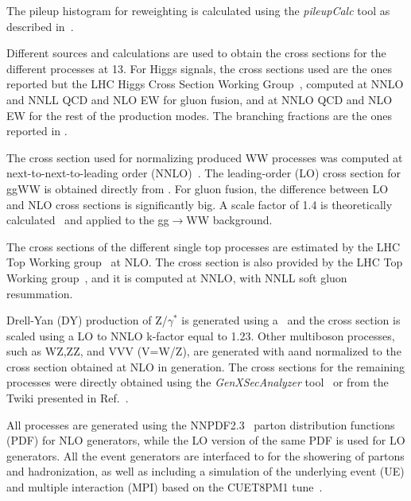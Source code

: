 The pileup histogram for reweighting is calculated using the \emph{pileupCalc} tool as described in~\cite{puJSON}. 


Different sources and calculations are used to obtain the cross sections for the different processes at 13\TeV. 
For Higgs signals, the cross sections used are the ones reported but the LHC Higgs Cross Section Working Group~\cite{temphiggsxsecs},
computed at NNLO and NNLL QCD and NLO EW for gluon fusion, and at NNLO QCD and NLO EW for the rest of the production modes.
The branching fractions are the ones reported in \cite{Heinemeyer:2013tqa}. 

The cross section used for normalizing \qqbar produced WW processes was computed at next-to-next-to-leading order
(NNLO)~\cite{Gehrmann:2014fva}. The leading-order (LO) cross section for ggWW is obtained directly from \MCFM.
For gluon fusion, the difference between LO and NLO cross sections is significantly big.
A scale factor of 1.4 is theoretically calculated~\cite{Caola:2015rqy} and applied to the gg$\to$WW background. 


The cross sections of the different single top processes are estimated by the LHC Top Working group~\cite{singletop} at NLO.
The \ttbar cross section is also provided by the LHC Top Working group~\cite{topxsec}, and it is computed at NNLO, with NNLL soft gluon resummation. 

Drell-Yan (DY) production of Z/$\gamma^{*}$ is generated using a\MADGRAPH~\cite{Alwall:2014hca} and the cross section is scaled using a LO to NNLO k-factor equal to 1.23. 
Other multiboson processes, such as WZ,ZZ, and VVV (V=W/Z), are generated with a\MCATNLO and normalized
to the cross section obtained at NLO in generation.
The cross sections for the remaining processes were directly obtained using the \emph{GenXSecAnalyzer}
tool~\cite{genxsec} or from the Twiki presented in Ref.~\cite{25nstwiki}.

All processes are generated using the NNPDF2.3~\cite{Ball:2013hta,Ball:2011uy} parton distribution functions (PDF) for NLO generators,
while the LO version of the same PDF is used for LO generators. All the event generators are interfaced 
to  for the showering of partons and hadronization, as well as including a simulation of the 
underlying event (UE) and multiple interaction (MPI) based on the CUET8PM1 tune~\cite{Khachatryan:2015pea}.





